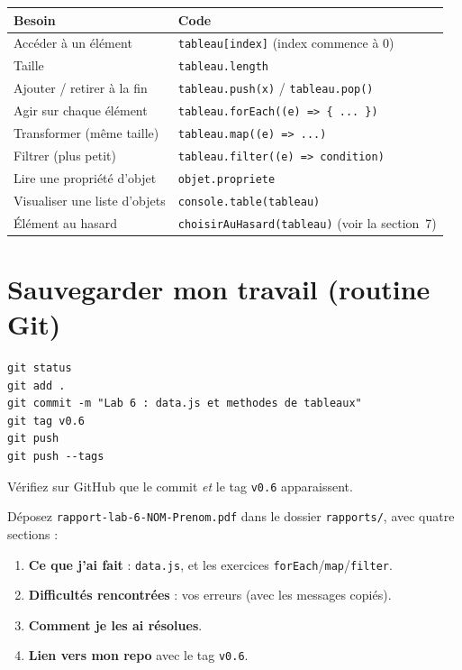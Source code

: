 \documentclass[11pt,a4paper]{article}
\newcommand{\code}[1]{\texttt{#1}}
\begin{document}
\begin{center}
\begin{tabular}{p{4.6cm} p{8.4cm}}
\toprule
\textbf{Besoin} & \textbf{Code} \\
\midrule
Accéder à un élément & \code{tableau[index]} \quad (index commence à 0) \\
Taille & \code{tableau.length} \\
Ajouter / retirer à la fin & \code{tableau.push(x)} \quad / \quad \code{tableau.pop()} \\
Agir sur chaque élément & \code{tableau.forEach((e) => \{ ... \})} \\
Transformer (même taille) & \code{tableau.map((e) => ...)} \\
Filtrer (plus petit) & \code{tableau.filter((e) => condition)} \\
Lire une propriété d'objet & \code{objet.propriete} \\
Visualiser une liste d'objets & \code{console.table(tableau)} \\
Élément au hasard & \code{choisirAuHasard(tableau)} \quad (voir la section~7) \\
\bottomrule
\end{tabular}
\end{center}

\section{Sauvegarder mon travail (routine Git)}

\begin{retenirbox}
\begin{lstlisting}[style=html]
git status
git add .
git commit -m "Lab 6 : data.js et methodes de tableaux"
git tag v0.6
git push
git push --tags
\end{lstlisting}
Vérifiez sur GitHub que le commit \emph{et} le tag \code{v0.6} apparaissent.
\end{retenirbox}

\begin{attentionbox}
Déposez \code{rapport-lab-6-NOM-Prenom.pdf} dans le dossier \code{rapports/}, avec quatre sections :
\begin{enumerate}[leftmargin=*,noitemsep]
  \item \textbf{Ce que j'ai fait} : \code{data.js}, et les exercices \code{forEach}/\code{map}/\code{filter}.
  \item \textbf{Difficultés rencontrées} : vos erreurs (avec les messages copiés).
  \item \textbf{Comment je les ai résolues}.
  \item \textbf{Lien vers mon repo} avec le tag \code{v0.6}.
\end{enumerate}
\end{attentionbox}
\end{document}
